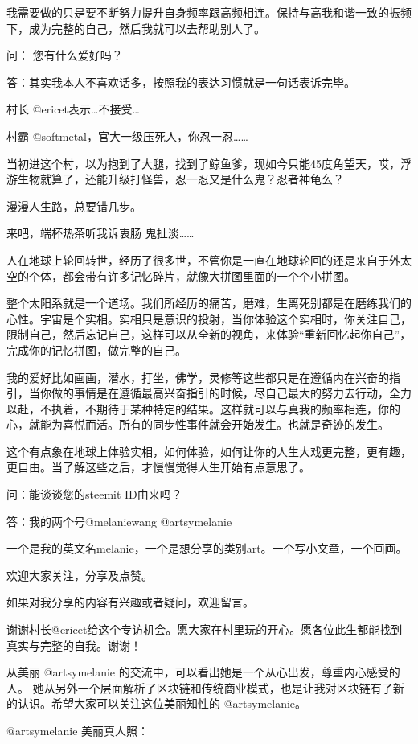 \documentclass[]{ctexbook}
\begin{document}
我需要做的只是要不断努力提升自身频率跟高频相连。保持与高我和谐一致的振频下，成为完整的自己，然后我就可以去帮助别人了。

问： 您有什么爱好吗？

答：其实我本人不喜欢话多，按照我的表达习惯就是一句话表诉完毕。

村长 @ericet表示\ldots{}不接受\ldots{}

村霸 @softmetal，官大一级压死人，你忍一忍\ldots{}\ldots{}

当初进这个村，以为抱到了大腿，找到了鲸鱼爹，现如今只能45度角望天，哎，浮游生物就算了，还能升级打怪兽，忍一忍又是什么鬼？忍者神龟么？

漫漫人生路，总要错几步。

来吧，端杯热茶听我诉衷肠 鬼扯淡\ldots{}\ldots{}

人在地球上轮回转世，经历了很多世，不管你是一直在地球轮回的还是来自于外太空的个体，都会带有许多记忆碎片，就像大拼图里面的一个个小拼图。

整个太阳系就是一个道场。我们所经历的痛苦，磨难，生离死别都是在磨练我们的心性。宇宙是个实相。实相只是意识的投射，当你体验这个实相时，你关注自己，限制自己，然后忘记自己，这样可以从全新的视角，来体验``重新回忆起你自己''，完成你的记忆拼图，做完整的自己。

我的爱好比如画画，潜水，打坐，佛学，灵修等这些都只是在遵循内在兴奋的指引，当你做的事情是在遵循最高兴奋指引的时候，尽自己最大的努力去行动，全力以赴，不执着，不期待于某种特定的结果。这样就可以与真我的频率相连，你的心，就能为喜悦而活。所有的同步性事件就会开始发生。也就是奇迹的发生。

这个有点象在地球上体验实相，如何体验，如何让你的人生大戏更完整，更有趣，更自由。当了解这些之后，才慢慢觉得人生开始有点意思了。

问：能谈谈您的steemit ID由来吗？

答：我的两个号@melaniewang @artsymelanie

一个是我的英文名melanie，一个是想分享的类别art。一个写小文章，一个画画。

欢迎大家关注，分享及点赞。

如果对我分享的内容有兴趣或者疑问，欢迎留言。

谢谢村长@ericet给这个专访机会。愿大家在村里玩的开心。愿各位此生都能找到真实与完整的自我。谢谢！

从美丽 @artsymelanie 的交流中，可以看出她是一个从心出发，尊重内心感受的人。 她从另外一个层面解析了区块链和传统商业模式，也是让我对区块链有了新的认识。希望大家可以关注这位美丽知性的 @artsymelanie。

@artsymelanie 美丽真人照：
\end{document}
